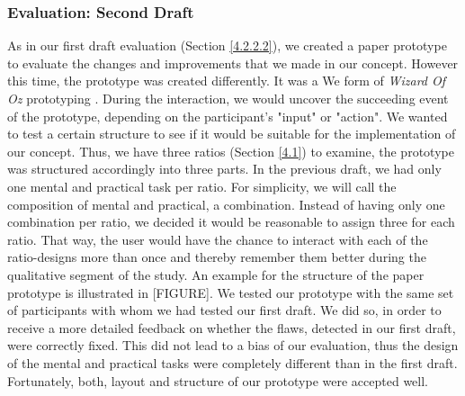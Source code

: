 \subsubsection{Evaluation: Second Draft} \label{4.2.2.4}

As in our first draft evaluation (Section \ref{4.2.2.2}), we created a paper prototype to evaluate the changes and improvements that we made in our concept. However this time, the prototype was created differently. It was a  We  form of \textit{Wizard Of Oz} prototyping \cite{Butz2014}. During the interaction, we would uncover the succeeding event of the prototype, depending on the participant's "input" or "action". We wanted to test a certain structure to see if it would be suitable for the implementation of our concept. Thus, we have three ratios (Section \ref{4.1}) to examine, the prototype was structured accordingly into three parts. In the previous draft, we had only one mental and practical task per ratio. For simplicity, we will call the composition of mental and practical, a combination. Instead of having only one combination per ratio, we decided it would be reasonable to assign three for each ratio. That way, the user would have the chance to interact with each of the ratio-designs more than once and thereby remember them better during the qualitative segment of the study. An example for the structure of the paper prototype is illustrated in [FIGURE]. We tested our prototype with the same set of participants with whom we had tested our first draft. We did so, in order to receive a more detailed feedback on whether the flaws, detected in our first draft, were correctly fixed. This did not lead to a bias of our evaluation, thus the design of the mental and practical tasks were completely different than in the first draft. Fortunately, both, layout and structure of our prototype were accepted well. \\

